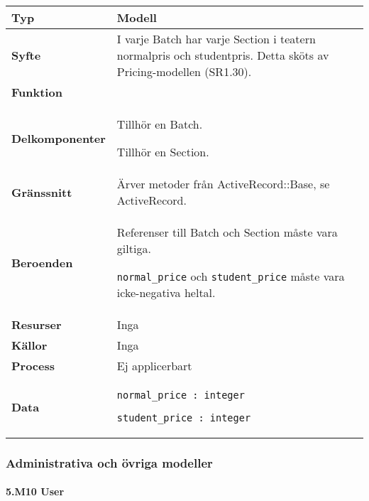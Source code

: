 \documentclass[a4paper, twoside, 11pt, titlepage]{article}
\begin{document}
			\begin {table} [ht] \begin{tabular} {  p{3.5cm} p{11.6cm} }
				\hline
				{\sffamily\textbf{Typ}} & {Modell} \\
				\hline
				{\sffamily\textbf{Syfte}} & {I varje Batch har varje Section i teatern normalpris och studentpris. Detta sköts av Pricing-modellen (SR1.30).} \\
				\hline
				{\sffamily\textbf{Funktion}} & { } \\
				\hline
				{\sffamily\textbf{Delkomponenter}} & {Tillhör en Batch.

Tillhör en Section.} \\
				\hline
				{\sffamily\textbf{Gränssnitt}} & {Ärver metoder från ActiveRecord::Base, se ActiveRecord.} \\
				\hline
				{\sffamily\textbf{Beroenden}} & {Referenser till Batch och Section måste vara giltiga.

{\tt normal\_price} och {\tt student\_price} måste vara icke-negativa heltal.} \\
				\hline
				{\sffamily\textbf{Resurser}} & {Inga} \\
				\hline
				{\sffamily\textbf{Källor}} & {Inga} \\
				\hline
				{\sffamily\textbf{Process}} & {Ej applicerbart} \\
				\hline
				{\sffamily\textbf{Data}} & {{\tt normal\_price : integer}

{\tt student\_price : integer}} \\
				\hline
			\end{tabular} \end{table} \FloatBarrier


		\clearpage %
		\subsubsection{Administrativa och övriga modeller}



			\paragraph{5.M10 User}\
\end{document}
